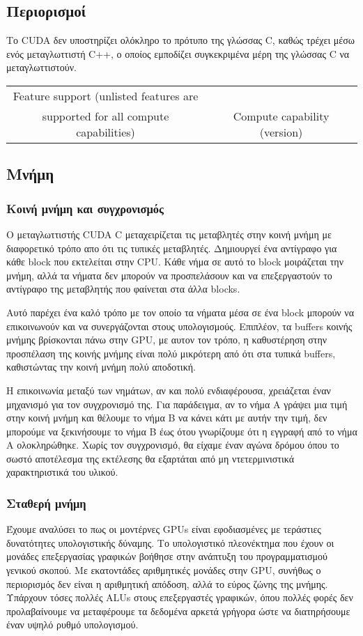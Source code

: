 \subsection{Περιορισμοί}
 Το CUDA δεν υποστηρίζει ολόκληρο το πρότυπο της γλώσσας C, καθώς τρέχει μέσω ενός μεταγλωττιστή C++, ο οποίος εμποδίζει συγκεκριμένα μέρη της γλώσσας C να μεταγλωττιστούν.
\begin{table}
\begin{tabular}{ | c | c |}
Feature support (unlisted features are\\ supported for all compute capabilities) & Compute capability (version)\\ \hline
\end{tabular}
\end{table}

\subsection{Μνήμη}
\subsubsection{Κοινή μνήμη και συγχρονισμός}
Ο μεταγλωττιστής CUDA C μεταχειρίζεται τις μεταβλητές στην κοινή μνήμη με διαφορετικό τρόπο απο ότι τις τυπικές μεταβλητές. Δημιουργεί ένα αντίγραφο για κάθε block που εκτελείται στην CPU. Κάθε νήμα σε αυτό το block μοιράζεται την μνήμη, αλλά τα νήματα δεν μπορούν να προσπελάσουν και να επεξεργαστούν το αντίγραφο της μεταβλητής που φαίνεται στα άλλα blocks.

Αυτό παρέχει ένα καλό τρόπο με τον οποίο τα νήματα μέσα σε ένα block μπορούν να επικοινωνούν και να συνεργάζονται στους υπολογισμούς. Επιπλέον, τα buffers κοινής μνήμης βρίσκονται πάνω στην GPU, με αυτον τον τρόπο, η καθυστέρηση στην προσπέλαση της κοινής μνήμης είναι πολύ μικρότερη από ότι στα τυπικά buffers, καθιστώντας την κοινή μνήμη πολύ αποδοτική.

Η επικοινωνία μεταξύ των νημάτων, αν και πολύ ενδιαφέρουσα, χρειάζεται έναν μηχανισμό για τον συγχρονισμό της. Για παράδειγμα, αν το νήμα Α γράψει μια τιμή στην κοινή μνήμη και θέλουμε το νήμα Β να κάνει κάτι με αυτήν την τιμή, δεν μπορούμε να ξεκινήσουμε το νήμα Β έως ότου γνωρίζουμε ότι η εγγραφή από το νήμα Α ολοκληρώθηκε. Χωρίς τον συγχρονισμό, θα είχαμε έναν αγώνα δρόμου όπου το σωστό αποτέλεσμα της εκτέλεσης θα εξαρτάται από μη ντετερμινιστικά χαρακτηριστικά του υλικού.
\subsubsection{Σταθερή μνήμη}
Έχουμε αναλύσει το πως οι μοντέρνες GPUs είναι εφοδιασμένες με τεράστιες δυνατότητες υπολογιστικής δύναμης. Το υπολογιστικό πλεονέκτημα που έχουν οι μονάδες επεξεργασίας γραφικών βοήθησε στην ανάπτυξη του προγραμματισμού γενικού σκοπού. Με εκατοντάδες αριθμητικές μονάδες στην GPU, συνήθως ο περιορισμός δεν είναι η αριθμητική απόδοση, αλλά το εύρος ζώνης της μνήμης. Υπάρχουν τόσες πολλές ALUs στους επεξεργαστές γραφικών, όπου πολλές φορές δεν προλαβαίνουμε να μεταφέρουμε τα δεδομένα αρκετά γρήγορα ώστε να διατηρήσουμε έναν υψηλό ρυθμό υπολογισμού. 

